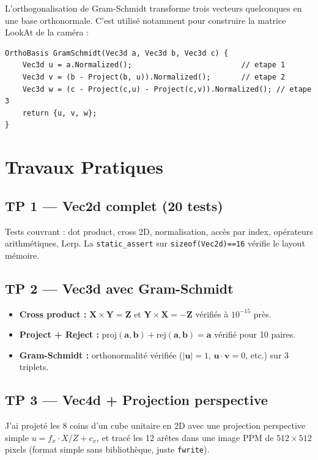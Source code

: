 \documentclass[12pt,a4paper]{report}
\newcommand{\code}[1]{\texttt{\textcolor{myblue}{#1}}}
\begin{document}
L'orthogonalisation de Gram-Schmidt transforme trois vecteurs quelconques en une base orthonormale. C'est utilisé notamment pour construire la matrice LookAt de la caméra :

\begin{lstlisting}[caption={Gram-Schmidt — 3 étapes}]
OrthoBasis GramSchmidt(Vec3d a, Vec3d b, Vec3d c) {
    Vec3d u = a.Normalized();                         // etape 1
    Vec3d v = (b - Project(b, u)).Normalized();       // etape 2
    Vec3d w = (c - Project(c,u) - Project(c,v)).Normalized(); // etape 3
    return {u, v, w};
}
\end{lstlisting}

\section{Travaux Pratiques}

\subsection{TP 1 — Vec2d complet (20 tests)}

Tests couvrant : dot product, cross 2D, normalisation, accès par index, opérateurs arithmétiques, Lerp. La \code{static\_assert} sur \code{sizeof(Vec2d)==16} vérifie le layout mémoire.

\subsection{TP 2 — Vec3d avec Gram-Schmidt}

\begin{itemize}
    \item \textbf{Cross product :} $\mathbf{X} \times \mathbf{Y} = \mathbf{Z}$ et $\mathbf{Y} \times \mathbf{X} = -\mathbf{Z}$ vérifiés à $10^{-15}$ près.
    \item \textbf{Project + Reject :} $\text{proj}(\mathbf{a},\mathbf{b}) + \text{rej}(\mathbf{a},\mathbf{b}) = \mathbf{a}$ vérifié pour 10 paires.
    \item \textbf{Gram-Schmidt :} orthonormalité vérifiée ($|\mathbf{u}|=1$, $\mathbf{u}\cdot\mathbf{v}=0$, etc.) sur 3 triplets.
\end{itemize}

\subsection{TP 3 — Vec4d + Projection perspective}

J'ai projeté les 8 coins d'un cube unitaire en 2D avec une projection perspective simple $u = f_x \cdot X/Z + c_x$, et tracé les 12 arêtes dans une image PPM de $512 \times 512$ pixels (format simple sans bibliothèque, juste \code{fwrite}).
\end{document}
